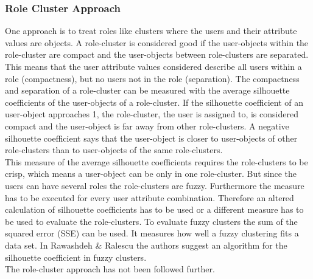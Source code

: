         \subsubsection{Role Cluster Approach}
        One approach is to treat roles like clusters where the users and their attribute values are objects. A role-cluster is considered good if the user-objects within the role-cluster are compact and the user-objects between role-clusters are separated. This means that the user attribute values considered describe all users within a role (compactness), but no users not in the role (separation). The compactness and separation of a role-cluster can be measured with the average silhouette coefficients of the user-objects of a role-cluster\cite{Han}. If the silhouette coefficient of an user-object approaches 1, the role-cluster, the user is assigned to, is considered compact and the user-object is far away from other role-clusters. A negative silhouette coefficient says that the user-object is closer to user-objects of other role-clusters than to user-objects of the same role-clusters.\\
        This measure of the average silhouette coefficients requires the role-clusters to be crisp, which means a user-object can be only in one role-cluster. But since the users can have several roles the role-clusters are fuzzy. Furthermore the measure has to be executed for every user attribute combination. Therefore an altered calculation of silhouette coefficients has to be used or a different measure has to be used to evaluate the role-clusters. To evaluate fuzzy clusters the sum of the squared error (SSE) can be used\cite{Han}. It measures how well a fuzzy clustering fits a data set. In Rawashdeh \& Ralescu\cite{rawashdeh2012fuzzy} the authors suggest an algorithm for the silhouette coefficient in fuzzy clusters.\\
        The role-cluster approach has not been followed further.\\
